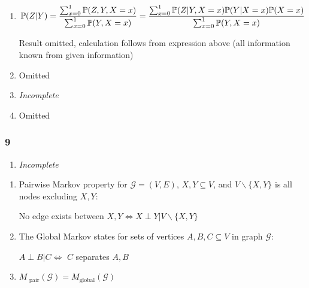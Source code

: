 \documentclass[11pt]{article}
\begin{document}
\begin{enumerate}[label=(\alph*)]
    \item 
    \begin{gather*}
        \mathbb{P}(Z|Y)
        =
        \frac{ \sum_{x=0}^1 \mathbb{P}(Z, Y, X=x)}
        { \sum_{x=0}^1 \mathbb{P}(Y, X=x) }
        =
        \frac{ \sum_{x=0}^1 \mathbb{P}(Z|Y, X=x)\mathbb{P}(Y|X=x)\mathbb{P}(X=x)}
        { \sum_{x=0}^1 \mathbb{P}(Y, X=x) }
    \end{gather*}
    
    Result omitted, calculation follows from expression above (all information known from given information)
    
    \item Omitted 
    \item {\it Incomplete}
    \item Omitted   
\end{enumerate}



\subsubsection*{9}

\begin{enumerate}[label=(\alph*)]
    \item {\it Incomplete}
\end{enumerate}



\begin{enumerate}
    \item Pairwise Markov property for $\mathcal{G}=(V,E)$,  $X,Y \subseteq V$, and $V\backslash\{X,Y\}$ is all nodes excluding $X,Y$:
    
    {\centering No edge exists between $X,Y \Leftrightarrow X \perp Y | V\backslash\{X,Y\}$ \par}


    \item The Global Markov states for sets of vertices $A, B, C \subseteq V$ in graph $\mathcal{G}$:   

    {\centering 
    $A \perp B | C 
    \Leftrightarrow $
    $C$ separates $A,B$
    \par}

    \item $M_\text{ pair}(\mathcal{G})
    =
    M_\text{global}(\mathcal{G})$
\end{enumerate}
\end{document}
